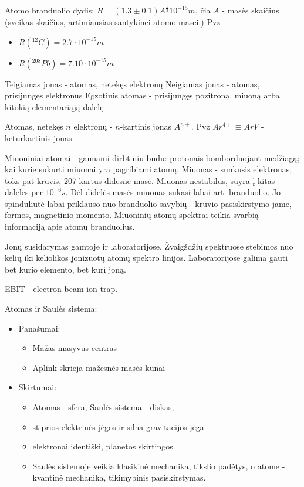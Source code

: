 Atomo branduolio dydis: $R = (1.3 \pm 0.1)A^{\frac{1}{3}}10^{-15}m$, čia $A$ - masės skaičius (sveikas skaičius, artimiausias santykinei atomo masei.) Pvz
\begin{itemize}
    \item $R({}^{12}C)=2.7 \cdot 10^{-15} m$
    \item $R({}^{208}Pb)=7.10 \cdot 10^{-15} m$
\end{itemize}

Teigiamas jonas - atomas, netekęs elektronų
Neigiamas jonas - atomas, prisijungęs elektronus
Egzotinis atomas - prisijungęs pozitroną, miuoną arba kitokią elementariąją dalelę

Atomas, netekęs $n$ elektronų - $n$-kartinis jonas $A^{n+}$. Pvz $Ar^{4+} \equiv ArV$ - keturkartinis jonas.

Miuoniniai atomai - gaunami dirbtiniu būdu: protonais bomborduojant medžiagą; kai kurie sukurti miuonai yra pagribiami atomų. Miuonas - sunkusis elektronas, toks pat krūvis, 207 kartus didesnė masė. Miuonas nestabilus, suyra į kitas daleles per $10^{-6}s$. Dėl didelės masės miuonas sukasi labai arti branduolio. Jo spinduliutė labai priklauso nuo branduolio savybių - krūvio pasiskirstymo jame, formos, magnetinio momento. Miuoninių atomų spektrai teikia svarbią informaciją apie atomų branduolius.

Jonų susidarymas gamtoje ir laboratorijose. Žvaigždžių spektruose stebimos nuo kelių iki keliolikos jonizuotų atomų spektro linijos. Laboratorijose galima gauti bet kurio elemento, bet kurį joną.

EBIT - electron beam ion trap.

Atomas ir Saulės sistema:
\begin{itemize}
    \item Panašumai:
    \begin{itemize}
        \item Mažas masyvus centras
        \item Aplink skrieja mažesnės masės kūnai
    \end{itemize}
    \item Skirtumai:
    \begin{itemize}
        \item Atomas - sfera, Saulės sistema - diskas,
        \item stiprios elektrinės jėgos ir silna gravitacijos jėga
        \item elektronai identiški, planetos skirtingos
        \item Saulės sistemoje veikia klasikinė mechanika, tikslio padėtys, o atome - kvantinė mechanika, tikimybinis pasiskirstymas.
    \end{itemize}
\end{itemize}

